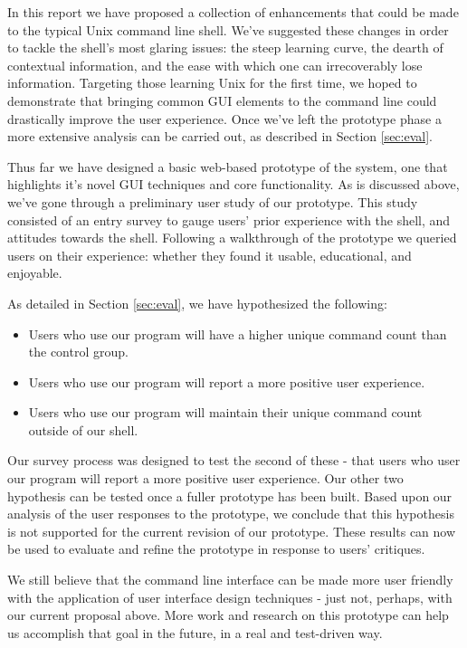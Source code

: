 In this report we have proposed a collection of enhancements that
could be made to the typical Unix command line shell. We've suggested these
changes in order to tackle the shell's most glaring issues: the steep learning
curve, the dearth of contextual information, and the ease with which one can
irrecoverably lose information. Targeting those learning Unix for the first
time, we hoped to demonstrate that bringing common GUI elements to the command
line could drastically improve the user experience. Once we've left the
prototype phase a more extensive analysis can be carried out, as described in
Section \ref{sec:eval}.

Thus far we have designed a basic web-based prototype of the system, one that
highlights it's novel GUI techniques and core functionality. As is discussed
above, we've gone through a preliminary user study of our prototype. This study
consisted of an entry survey to gauge users' prior experience with the shell,
and attitudes towards the shell. Following a walkthrough of the prototype we
queried users on their experience: whether they found it usable, educational,
and enjoyable.

As detailed in Section \ref{sec:eval}, we have hypothesized the following:
\begin{itemize}
  \item Users who use our program will have a higher unique command count than
  the control group.
  \item Users who use our program will report a more positive user experience.
  \item Users who use our program will maintain their unique command count
  outside of our shell.
\end{itemize}
Our survey process was designed to test the second of these - that users who
user our program will report a more positive user experience. Our other two
hypothesis can be tested once a fuller prototype has been built. Based upon our
analysis of the user responses to the prototype, we conclude that this
hypothesis is not supported for the current revision of our prototype. These
results can now be used to evaluate and refine the prototype in response to
users' critiques.

We still believe that the command line interface can be made more user friendly
with the application of user interface design techniques - just not, perhaps,
with our current proposal above. More work and research on this prototype can
help us accomplish that goal in the future, in a real and test-driven way.




